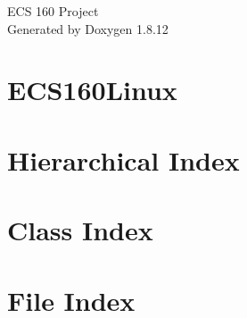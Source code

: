 \documentclass[twoside]{book}
\newcommand{\+}{\discretionary{\mbox{\scriptsize$\hookleftarrow$}}{}{}}
\newcommand{\clearemptydoublepage}{%
  \newpage{\pagestyle{empty}\cleardoublepage}%
}
\begin{document}
\hypersetup{pageanchor=false,
             bookmarksnumbered=true,
             pdfencoding=unicode
            }
\begin{titlepage}
\vspace*{7cm}
\begin{center}%
{\Large E\+CS 160 Project }\\
\vspace*{1cm}
{\large Generated by Doxygen 1.8.12}\\
\end{center}
\end{titlepage}
\clearemptydoublepage
{}
\tableofcontents
\clearemptydoublepage
{}
\hypersetup{pageanchor=true}

\chapter{E\+C\+S160\+Linux}
\label{md_README}
\hypertarget{md_README}{}

\chapter{Hierarchical Index}

\chapter{Class Index}

\chapter{File Index}

\end{document}
